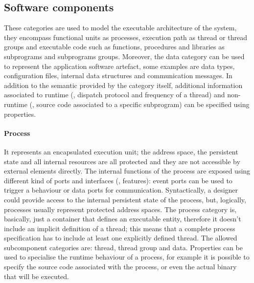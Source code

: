 \subsection{Software components}
These categories are used to model the executable architecture of the system, they encompass functional units as processes, execution path as thread or thread groups and executable code such as functions, procedures and libraries as subprograms and subprograms groups. Moreover, the data category can be used to represent the application software artefact, some examples are data types, configuration files, internal data structures and communication messages. In addition to the semantic provided by the category itself, additional information associated to runtime (\eg, dispatch protocol and frequency of a thread) and non-runtime (\eg, source code associated to a specific subprogram) can be specified using properties.

\paragraph{Process} It represents an encapsulated execution unit; the address space, the persistent state and all internal resources are all protected and they are not accessible by external elements directly. The internal functions of the process are exposed using different kind of ports and interfaces (\ie, features): event ports can be used to trigger a behaviour or data ports for communication. Syntactically, a designer could provide access to the internal persistent state of the process, but, logically, processes usually represent protected address spaces. The process category is, basically, just a container that defines an executable entity, therefore it doesn't include an implicit definition of a thread; this means that a complete process specification has to include at least one explicitly defined thread. The allowed subcomponent categories are: thread, thread group and data. Properties can be used to specialise the runtime behaviour of a process, for example it is possible to specify the source code associated with the process, or even the actual binary that will be executed. 

